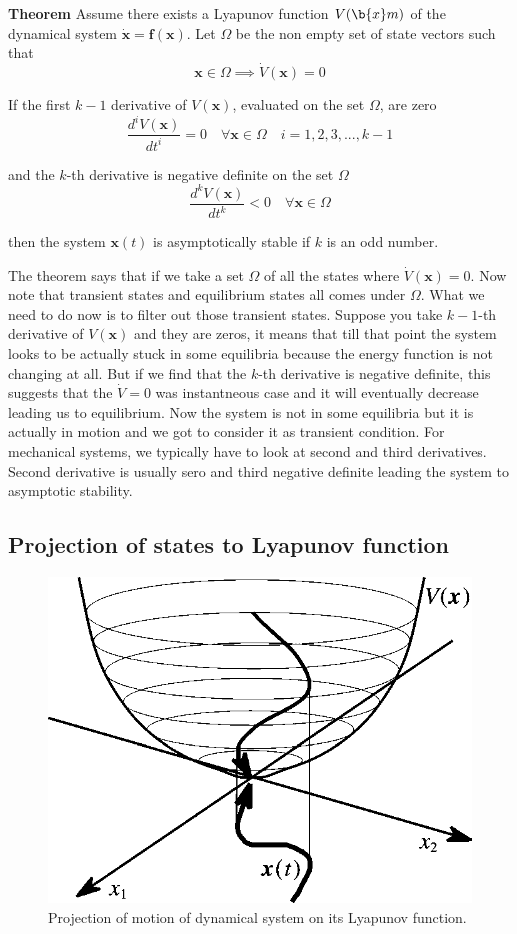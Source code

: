 \documentclass{article}
\begin{document}
\textbf{Theorem} Assume there exists a Lyapunov function $V(\b{x}m)$ of the dynamical system $\dot{\bm{x}}=\bm{f}(\bm{x})$. Let $\Omega$ be the non empty set of state vectors such that
$$
\bm{x}\in\Omega\implies\dot{V}(\bm{x})=0
$$

If the first $k-1$ derivative of $V(\bm{x})$, evaluated on the set $\Omega$, are zero
$$
\frac{d^{i}V(\bm{x})}{dt^{i}}=0\quad\forall\bm{x}\in\Omega\quad i=1,2,3,...,k-1
$$

and the $k$-th derivative is negative definite on the set $\Omega$
$$
\frac{d^{k}V(\bm{x})}{dt^{k}}<0\quad\forall\bm{x}\in\Omega
$$

then the system $\bm{x}(t)$ is asymptotically stable if $k$ is an odd number.

The theorem says that if we take a set $\Omega$ of all the states where $\dot{V}(\bm{x})=0$. Now note that transient states and equilibrium states all comes under $\Omega$. What we need to do now is to filter out those transient states. Suppose you take $k-1$-th derivative of $V(\bm{x})$ and they are zeros, it means that till that point the system looks to be actually stuck in some equilibria because the energy function is not changing at all. But if we find that the $k$-th derivative is negative definite, this suggests that the $\dot{V}=0$ was instantneous case and it will eventually decrease leading us to equilibrium. Now the system is not in some equilibria but it is actually in motion and we got to consider it as transient condition. For mechanical systems, we typically have to look at second and third derivatives. Second derivative is usually sero and third negative definite leading the system to asymptotic stability.

\subsection{Projection of states to Lyapunov function}
\begin{figure}[ht]
  \label{fig_lyapunov_projection}
  \centering
  \includegraphics[scale=0.3, angle=0]{figs/fig_lyapunov_projection.png}
  \caption{Projection of motion of dynamical system on its Lyapunov function.}
\end{figure}
\end{document}
